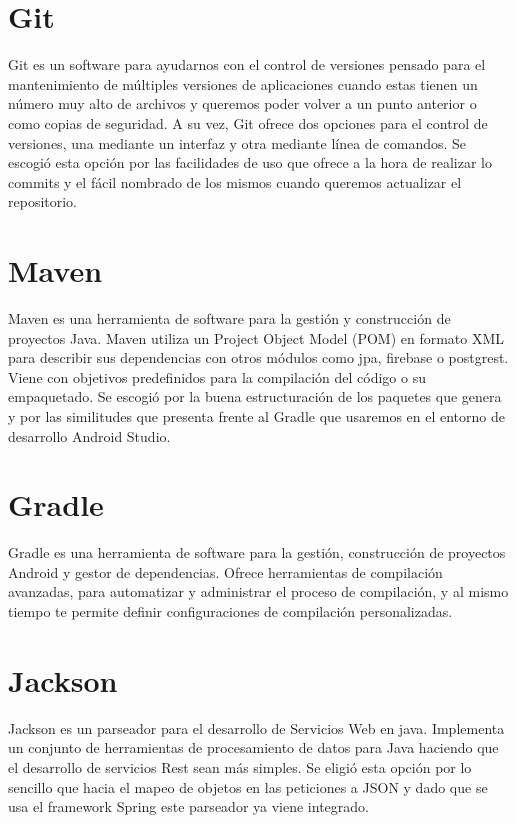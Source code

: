 \section{Git}
Git es un software para ayudarnos con el control de versiones  pensado para el mantenimiento de múltiples versiones de aplicaciones cuando estas tienen un número muy alto de archivos y queremos poder volver a un punto anterior o como copias de seguridad. A su vez, Git ofrece dos opciones para el control de versiones, una mediante un interfaz y otra mediante línea de comandos. Se escogió esta opción por las facilidades de uso que ofrece a la hora de realizar lo commits y el fácil nombrado de los mismos cuando queremos actualizar el repositorio.
\section{Maven}
Maven es una herramienta de software para la gestión y construcción de proyectos Java.
 Maven utiliza un Project Object Model (POM) en formato
XML para describir sus dependencias con otros módulos como jpa, firebase o postgrest. Viene con objetivos predefinidos para la compilación del código o su empaquetado. Se escogió por la buena estructuración de los paquetes que genera y por las similitudes que presenta frente al Gradle que usaremos en el entorno de desarrollo Android Studio.




\section{Gradle}
Gradle es una herramienta de software para la gestión, construcción de proyectos Android y gestor de dependencias. Ofrece
  herramientas de compilación avanzadas, para automatizar y administrar el proceso de compilación, y al mismo tiempo te permite definir configuraciones de compilación personalizadas.



\section{Jackson}

Jackson es un parseador para el desarrollo de Servicios Web en java. Implementa un conjunto de   herramientas de procesamiento de datos para Java haciendo que el desarrollo de servicios Rest sean más simples. Se eligió esta opción por lo sencillo que hacia el mapeo de objetos en las peticiones a JSON y dado que se usa el framework Spring este parseador ya viene integrado.









